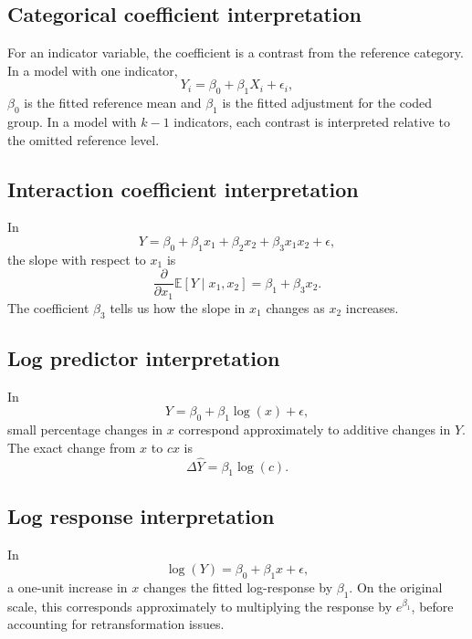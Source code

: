 \subsection*{Categorical coefficient interpretation}

For an indicator variable, the coefficient is a contrast from the reference category.  In a model with one indicator,
\begin{equation}
  Y_i=\beta_0+\beta_1X_i+\epsilon_i,
\end{equation}
\(\beta_0\) is the fitted reference mean and \(\beta_1\) is the fitted adjustment for the coded group.  In a model with \(k-1\) indicators, each contrast is interpreted relative to the omitted reference level.

\subsection*{Interaction coefficient interpretation}

In
\begin{equation}
  Y=\beta_0+\beta_1x_1+\beta_2x_2+\beta_3x_1x_2+\epsilon,
\end{equation}
the slope with respect to \(x_1\) is
\begin{equation}
  \frac{\partial}{\partial x_1}\mathbb{E}[Y\mid x_1,x_2]
  =\beta_1+\beta_3x_2.
\end{equation}
The coefficient \(\beta_3\) tells us how the slope in \(x_1\) changes as \(x_2\) increases.

\subsection*{Log predictor interpretation}

In
\begin{equation}
  Y=\beta_0+\beta_1\log(x)+\epsilon,
\end{equation}
small percentage changes in \(x\) correspond approximately to additive changes in \(Y\).  The exact change from \(x\) to \(cx\) is
\begin{equation}
  \Delta \widehat{Y}=\beta_1\log(c).
\end{equation}

\subsection*{Log response interpretation}

In
\begin{equation}
  \log(Y)=\beta_0+\beta_1x+\epsilon,
\end{equation}
a one-unit increase in \(x\) changes the fitted log-response by \(\beta_1\).  On the original scale, this corresponds approximately to multiplying the response by \(e^{\beta_1}\), before accounting for retransformation issues.

